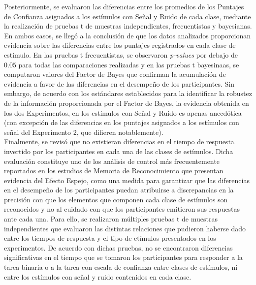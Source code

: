 Posteriormente, se evaluaron las diferencias entre los promedios de los Puntajes de Confianza asignados a los estímulos con Señal y Ruido de cada clase, mediante la realización de pruebas t de muestras independientes, frecuentistas y bayesianas. En ambos casos, se llegó a la conclusión de que los datos analizados proporcionan evidencia sobre las diferencias entre los puntajes registrados en cada clase de estímulo. En las pruebas t frecuentistas, se observaron \textit{p-values} por debajo de $0.05$ para todas las comparaciones realizadas y en las pruebas t bayesinaas, se computaron valores del Factor de Bayes que confirman la acumulación de evidencia a favor de las diferencias en el desempeño de los participantes. Sin embargo, de acuerdo con los estándares establecidos para la identificar la robustez de la información proporcionada por el Factor de Bayes, la evidencia obtenida en los dos Experimentos, en los estímulos con Señal y Ruido es apenas anecdótica (con excepción de las diferencias en los puntajes asignados a los estímulos con señal del Experimento 2, que difieren notablemente).\\

Finalmente, se revisó que no existieran diferencias en el tiempo de respuesta invertido por los participantes en cada una de las clases de estímulos. Dicha evaluación constituye uno de los análisis de control más frecuentemente reportados en los estudios de Memoria de Reconocimiento que presentan evidencia del Efecto Espejo, como una medida para garantizar que las diferencias en el desempeño de los participantes puedan atribuirse a discrepancias en la precisión con que los elementos que componen cada clase de estímulos son reconocidos y no al cuidado con que los participantes emitieron sus respuestas ante cada una. Para ello, se realizaron múltiples pruebas t de muestras independientes que evaluaron las distintas relaciones que pudieron haberse dado entre los tiempos de respuesta y el tipo de etímulos presentados en los experimentos. De acuerdo con dichas pruebas, no se encontraron diferencias significativas en el tiempo que se tomaron los participantes para responder a la tarea binaria o a la tarea con escala de confianza entre clases de estímulos, ni entre los estímulos con señal y ruido contenidos en cada clase.\\ 

